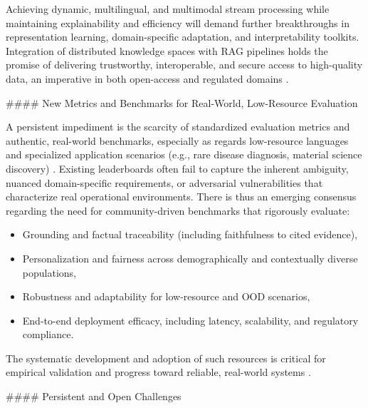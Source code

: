 \documentclass[11pt]{article}
\begin{document}
Achieving dynamic, multilingual, and multimodal stream processing while maintaining explainability and efficiency will demand further breakthroughs in representation learning, domain-specific adaptation, and interpretability toolkits. Integration of distributed knowledge spaces with RAG pipelines holds the promise of delivering trustworthy, interoperable, and secure access to high-quality data, an imperative in both open-access and regulated domains \cite{ref62}.

#### New Metrics and Benchmarks for Real-World, Low-Resource Evaluation

A persistent impediment is the scarcity of standardized evaluation metrics and authentic, real-world benchmarks, especially as regards low-resource languages and specialized application scenarios (e.g., rare disease diagnosis, material science discovery) \cite{ref8,ref16,ref20,ref25,ref29,ref32,ref36,ref39,ref40,ref46,ref47,ref48,ref50,ref53,ref54,ref55}. Existing leaderboards often fail to capture the inherent ambiguity, nuanced domain-specific requirements, or adversarial vulnerabilities that characterize real operational environments. There is thus an emerging consensus regarding the need for community-driven benchmarks that rigorously evaluate:
\begin{itemize}
    \item Grounding and factual traceability (including faithfulness to cited evidence),
    \item Personalization and fairness across demographically and contextually diverse populations,
    \item Robustness and adaptability for low-resource and OOD scenarios,
    \item End-to-end deployment efficacy, including latency, scalability, and regulatory compliance.
\end{itemize}
The systematic development and adoption of such resources is critical for empirical validation and progress toward reliable, real-world systems \cite{ref8,ref32,ref55}.

#### Persistent and Open Challenges
\end{document}
